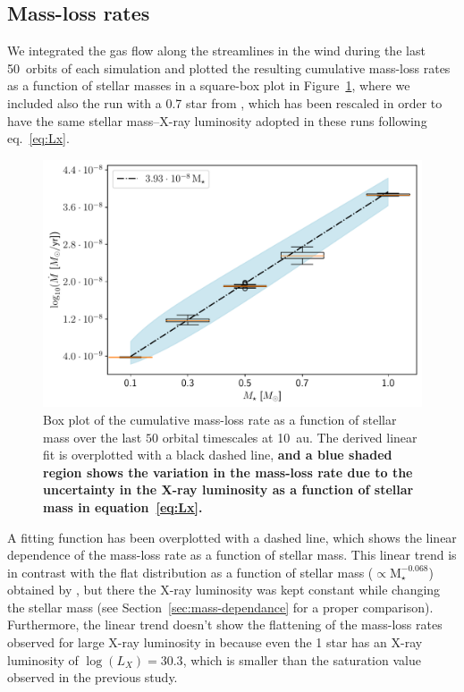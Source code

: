 \documentclass[usenatbib,useAMS,usedcolumn]{mnras}
\begin{document}
\subsection{Mass-loss rates}\label{sec:mdot}
We integrated the gas flow along the streamlines in the wind during the last \SI{50}{orbits} of each simulation and plotted the resulting cumulative mass-loss rates as a function of stellar masses in a square-box plot in Figure~\ref{fig:Mdot}, where we included also the run with a \SI{0.7}{\solarmass} star from , which has been rescaled in order to have the same stellar mass--X-ray luminosity adopted in these runs following eq.~\ref{eq:Lx}.
\begin{figure}
  \includegraphics[width=\columnwidth]{Figure6}
  \caption{Box plot of the cumulative mass-loss rate as a function of stellar mass over the last $50$ orbital timescales at \SI{10}{\astronomicalunit}. The derived linear fit is overplotted with a black dashed line, \textbf{and a blue shaded region shows the variation in the mass-loss rate due to the uncertainty in the X-ray luminosity as a function of stellar mass in equation~\ref{eq:Lx}.} \label{fig:Mdot}}
\end{figure}
A fitting function has been overplotted with a dashed line, which shows the linear dependence of the mass-loss rate as a function of stellar mass. This linear trend is in contrast with the flat distribution as a function of stellar mass ($\propto \mathrm{M}_\star^{-0.068}$) obtained by , but there the X-ray luminosity was kept constant while changing the stellar mass (see Section~\ref{sec:mass-dependance} for a proper comparison). Furthermore, the linear trend doesn't show the flattening of the mass-loss rates observed for large X-ray luminosity in  because even the \SI{1}{\solarmass} star has an X-ray luminosity of $\log(L_X) = 30.3$, which is smaller than the saturation value observed in the previous study.
\end{document}
